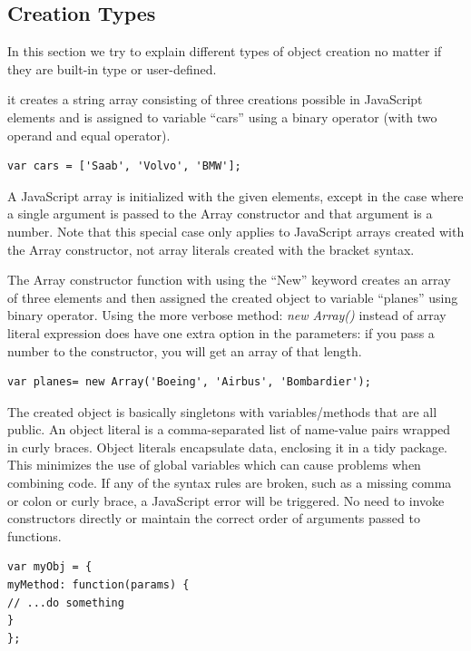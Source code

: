 \subsection{Creation Types}
In this section we try to explain different types of object creation no matter if they are built-in type or user-defined. 


it creates a string array consisting of three creations possible in JavaScript elements and is assigned to variable “cars” using a binary operator (with two operand and equal operator). 
\medskip
\begin{lstlisting}[caption=Array literal expression]
var cars = ['Saab', 'Volvo', 'BMW'];
\end{lstlisting}
A JavaScript array is initialized with the given elements, except in the case where a single argument is passed to the Array constructor and that argument is a number. Note that this special case only applies to JavaScript arrays created with the Array constructor, not array literals created with the bracket syntax.
\\
\break
{}
\vspace{1mm}

The Array constructor function with using the “New” keyword creates an array of three elements and then assigned the created object to variable “planes” using binary operator. Using the more verbose method: \textit{new Array()} instead of array literal expression does have one extra option in the parameters: if you pass a number to the constructor, you will get an array of that length. 

\medskip
\begin{lstlisting}[caption=Array constructor]
var planes= new Array('Boeing', 'Airbus', 'Bombardier');
\end{lstlisting}



The created object is basically singletons with variables/methods that are all public. An object literal is a comma-separated list of name-value pairs wrapped in curly braces. Object literals encapsulate data, enclosing it in a tidy package. This minimizes the use of global variables which can cause problems when combining code. If any of the syntax rules are broken, such as a missing comma or colon or curly brace, a JavaScript error will be triggered. No need to invoke constructors directly or maintain the correct order of arguments passed to functions. 
\begin{lstlisting}[caption=Object literal expression]
var myObj = {
myMethod: function(params) {
// ...do something
}
};

\end{lstlisting}


